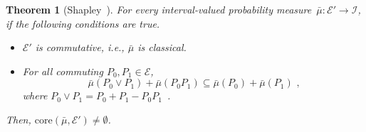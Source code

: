\documentclass[english,reprint, aps, prl,superscriptaddress, showpacs,
showkeys, longbibliography, amsmath, amssymb]{revtex4-1}
\theoremstyle{plain}
\newtheorem{thm}{Theorem}
\theoremstyle{definition}
\newcommand{\events}{\ensuremath{\mathcal{E}}}
\begin{document}
\begin{thm}[Shapley~\cite{Shapley1971,Grabisch2016}]\label{thm:Shapley}For
every interval-valued probability measure~$\bar{\mu}:\events'\rightarrow\mathscr{I}$,
if the following conditions are true.
\begin{itemize}
\item $\events'$ is commutative, i.e., $\bar{\mu}$ is classical.
\item For all commuting $P_{0},P_{1}\in\events$, 
\[
\bar{\mu}\left(P_{0}\vee P_{1}\right)+\bar{\mu}\left(P_{0}P_{1}\right)\subseteq\bar{\mu}\left(P_{0}\right)+\bar{\mu}\left(P_{1}\right)\textrm{ ,}
\]
where $P_{0}\vee P_{1}=P_{0}+P_{1}-P_{0}P_{1}$~\cite{Griffiths2003}.
\end{itemize}
Then, $\mathrm{core}\left(\bar{\mu},\events'\right)\ne\emptyset$.\end{thm}


\end{document}
